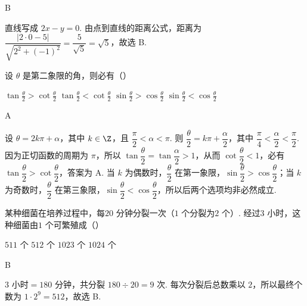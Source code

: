 \documentclass[UTF8,a4paper,oneside,11pt]{ctexbook}
\begin{document}
\begin{answer}
B
\end{answer}

\begin{solution}
直线写成 \(2x-y=0\). 由点到直线的距离公式，距离为 \(\dfrac{|2\cdot0-5|}{\sqrt{2^{2}+(-1)^{2}}}=\dfrac{5}{\sqrt5}=\sqrt5\)，故选 B.
\end{solution}

\begin{problem}
设 \(\theta\) 是第二象限的角，则必有（\quad）

\choices
    {\(\tan \frac{\theta}{2} > \cot \frac{\theta}{2}\)}
    {\(\tan \frac{\theta}{2} < \cot \frac{\theta}{2}\)}
    {\(\sin \frac{\theta}{2} >\cos \frac{\theta}{2}\)}
    {\(\sin \frac{\theta}{2} < \cos \frac{\theta}{2}\)}
\end{problem}

\begin{answer}
A
\end{answer}

\begin{solution}
设 \(\theta=2k\pi+\alpha\)，其中 \(k\in\Z\)，且 \(\dfrac{\pi}{2}<\alpha<\pi\). 则 \(\dfrac{\theta}{2}=k\pi+\dfrac{\alpha}{2}\)，其中 \(\dfrac{\pi}{4}<\dfrac{\alpha}{2}<\dfrac{\pi}{2}\). 因为正切函数的周期为 \(\pi\)，所以 \(\tan\dfrac{\theta}{2}=\tan\dfrac{\alpha}{2}>1\)，从而 \(\cot\dfrac{\theta}{2}<1\)，必有 \(\tan\dfrac{\theta}{2}>\cot\dfrac{\theta}{2}\)，答案为 A. 当 \(k\) 为偶数时，\(\dfrac{\theta}{2}\) 在第一象限，\(\sin\dfrac{\theta}{2}>\cos\dfrac{\theta}{2}\)；当 \(k\) 为奇数时，\(\dfrac{\theta}{2}\) 在第三象限，\(\sin\dfrac{\theta}{2}<\cos\dfrac{\theta}{2}\)，所以后两个选项均非必然成立.
\end{solution}

\begin{problem}
某种细菌在培养过程中，每\(20\text{ 分钟}\)分裂一次（\(1\text{ 个}\)分裂为\(2\text{ 个}\)）. 经过\(3\text{ 小时}\)，这种细菌由\(1\text{ 个}\)可繁殖成（\quad）

\choices
    {\(511\text{ 个}\)}
    {\(512\text{ 个}\)}
    {\(1023\text{ 个}\)}
    {\(1024\text{ 个}\)}
\end{problem}

\begin{answer}
B
\end{answer}

\begin{solution}
\(3\text{ 小时}=180\text{ 分钟}\)，共分裂 \(180\div20=9\) 次. 每次分裂后总数乘以 \(2\)，所以最终个数为 \(1\cdot2^{9}=512\)，故选 B.
\end{solution}
\end{document}
